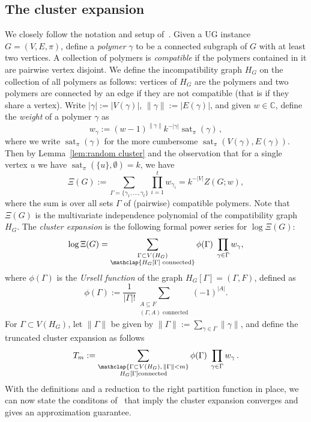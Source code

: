 \documentclass[10pt,a4paper]{article}
\theoremstyle{definition}
\DeclareMathOperator{\sat}{sat}
\newcommand*{\CC}{\mathbb{C}}
\begin{document}
\subsection{The cluster expansion}
%
We closely follow the notation and setup of~\cite{BCHPT19,HPR19}. Given a UG instance $G=(V,E,\pi)$, define a \emph{polymer} $\gamma$ to be a connected subgraph of $G$ with at least two vertices. A collection of polymers is \emph{compatible} if the polymers contained in it are pairwise vertex disjoint.
We define the incompatibility graph $H_G$ on the collection of all polymers as follows: vertices of $H_G$ are the polymers and two polymers are connected by an edge if they are not compatible (that is if they share a vertex). 
Write $|\gamma|:=|V(\gamma)|$, $\|\gamma \|:=|E(\gamma)|$, and given $w\in\CC$, define the \emph{weight} of a polymer $\gamma$ as 
\[
w_\gamma:=(w-1)^{\|\gamma\|}k^{-|\gamma|}\sat_\pi(\gamma)\,,
\]
where we write $\sat_\pi(\gamma)$ for the more cumbersome $\sat_\pi(V(\gamma),E(\gamma))$.
Then by Lemma~\ref{lem:random cluster} and the observation that for a single vertex $u$ we have $\sat_\pi(\{u\},\emptyset)=k$, we have 
\[
\Xi(G):=\sum_{\Gamma=\{\gamma_1,\ldots,\gamma_t\}}\prod_{i=1}^t w_{\gamma_i}=k^{-|V|}Z(G;w),
\]
where the sum is over all sets $\Gamma$ of (pairwise) compatible polymers. 
Note that $\Xi(G)$ is the multivariate independence polynomial of the compatibility graph $H_G$.
%
%
The \emph{cluster expansion} is the following formal power series for $\log\Xi(G)$:
\begin{equation}\label{eq:cluster expansion}
\log\Xi(G)=\sum_{\substack{\Gamma\subset V(H_G)\\\mathclap{H_G[\Gamma] \text{ connected}}}}\phi(\Gamma)\;\prod_{\gamma\in \Gamma}w_\gamma,
\end{equation}
where $\phi(\Gamma)$ is the \emph{Ursell function} of the graph $H_G[\Gamma]=(\Gamma,F)$, defined as
\[
\phi(\Gamma):=
\frac{1}{|\Gamma|!}\sum_{\substack{A\subseteq F\\ (\Gamma, A)\text{ connected}}} (-1)^{|A|}.
\]
For $\Gamma\subset V(H_G)$, let $\|\Gamma\|$ be given by $\|\Gamma\|:=\sum_{\gamma\in \Gamma}\|\gamma\|$, and define the truncated cluster expansion as follows
\begin{equation}
T_m:=\sum_{\substack{\mathclap{\Gamma\subset V(H_G),\, \|\Gamma\|< m}\\H_G[\Gamma] \text{connected}}}\phi(\Gamma)\;\prod_{\gamma\in \Gamma}w_\gamma\,.
\end{equation}
%
With the definitions and a reduction to the right partition function in place, we can now state the conditons of~\cite{BCHPT19} that imply the cluster expansion converges and gives an approximation guarantee.
\end{document}
